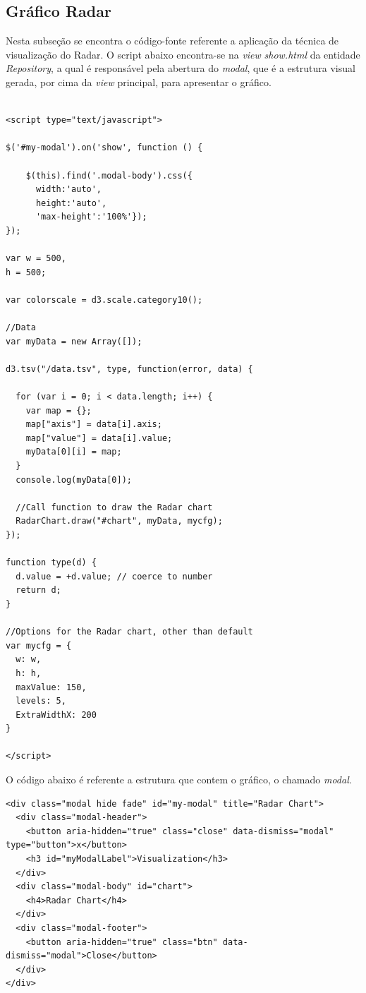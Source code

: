 \subsection{Gráfico Radar}
\label{radar-chart-code}
Nesta subseção se encontra o código-fonte referente a aplicação da técnica de visualização do Radar. O script abaixo encontra-se na \textit{view} \textit{show.html} da entidade \textit{Repository}, a qual é responsável pela abertura do \textit{modal}, que é a estrutura visual gerada, por cima da \textit{view} principal, para apresentar o gráfico.

\begin{lstlisting}

<script type="text/javascript">

$('#my-modal').on('show', function () {

    $(this).find('.modal-body').css({
      width:'auto',
      height:'auto', 
      'max-height':'100%'});
});

var w = 500,
h = 500;

var colorscale = d3.scale.category10();

//Data
var myData = new Array([]);

d3.tsv("/data.tsv", type, function(error, data) {
  
  for (var i = 0; i < data.length; i++) { 
    var map = {};
    map["axis"] = data[i].axis;
    map["value"] = data[i].value;   
    myData[0][i] = map;
  }
  console.log(myData[0]);

  //Call function to draw the Radar chart
  RadarChart.draw("#chart", myData, mycfg);
});

function type(d) {
  d.value = +d.value; // coerce to number
  return d;
}

//Options for the Radar chart, other than default
var mycfg = {
  w: w,
  h: h,
  maxValue: 150,
  levels: 5,
  ExtraWidthX: 200
}

</script>

\end{lstlisting}

O código abaixo é referente a estrutura que contem o gráfico, o chamado \textit{modal}.

\begin{lstlisting}
<div class="modal hide fade" id="my-modal" title="Radar Chart">
  <div class="modal-header">
    <button aria-hidden="true" class="close" data-dismiss="modal" type="button">x</button>
    <h3 id="myModalLabel">Visualization</h3>
  </div>
  <div class="modal-body" id="chart">
    <h4>Radar Chart</h4>
  </div>
  <div class="modal-footer">
    <button aria-hidden="true" class="btn" data-dismiss="modal">Close</button>
  </div>
</div>
\end{lstlisting}

